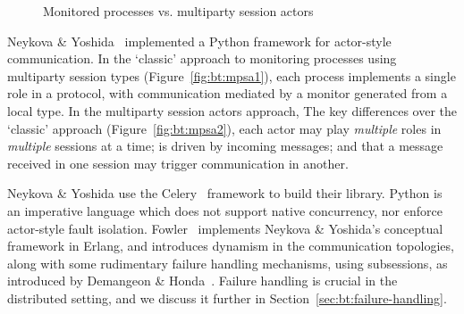\documentclass[
graybox,
envcountchap
]{svmult}
\begin{document}
\begin{bibunit}
\begin{figure}[t]
    \hfill
    \caption{Monitored processes vs. multiparty session actors}
    \label{fig:bt:mpst-actor}
  \end{figure}


  Neykova \& Yoshida~\cite{NeykovaY16:sactor} implemented a Python framework for
  actor-style communication.
  In the `classic' approach to monitoring processes using multiparty session
  types (Figure~\ref{fig:bt:mpsa1}), each process implements a single role in a
  protocol, with communication mediated by a monitor generated from a local
  type.
  In the multiparty session actors approach,
  The key differences over the `classic' approach (Figure~\ref{fig:bt:mpsa2}),
  each actor may play \emph{multiple} roles in \emph{multiple} sessions at a
  time; is driven by incoming messages; and that a message received in one
  session may trigger communication in another.

  Neykova \& Yoshida use the Celery~\cite{celery} framework to build their
  library. Python is an imperative language which does not support native
  concurrency, nor enforce actor-style fault isolation.
  Fowler~\cite{Fowler16:actors} implements Neykova \& Yoshida's conceptual
  framework in Erlang, and introduces dynamism in the communication topologies,
  along with some rudimentary failure handling
  mechanisms, using subsessions, as introduced by Demangeon \&
  Honda~\cite{DemangeonH12:subsessions}. Failure handling is crucial in the
  distributed setting, and we discuss it further in
  Section~\ref{sec:bt:failure-handling}.


\end{bibunit}
\end{document}
